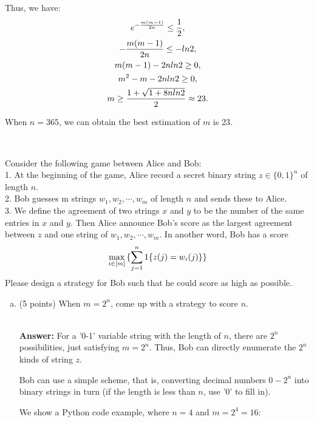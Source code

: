 \documentclass[12pt]{article}
\newcommand{\Answer}{\ \\ \textbf{Answer:} }
\begin{document}
\begin{problem}
Thus, we have:
\begin{gather*}
e^{-\frac{m(m-1)}{2n}} \le \frac{1}{2}, \\ \notag
-\frac{m(m-1)}{2n} \le -ln2, \\
m(m - 1) - 2n ln 2 \ge 0, \\
m^2 - m - 2n ln 2 \ge 0, \\
m \ge \frac{1 + \sqrt{1 + 8n ln2}}{2} \approx 23.\\
\end{gather*}

When $n = 365$, we can obtain the best estimation of $m$ is 23.
\end{problem}



~\\
\begin{problem}
Consider the following game between Alice and Bob: \\
1. At the beginning of the game, Alice record a secret binary string $z \in \{0, 1\}^n$ of length $n$. \\
2. Bob guesses m strings $w_1, w_2, \cdots, w_m$ of length $n$ and sends these to Alice. \\
3. We define the agreement of two strings $x$ and $y$ to be the number of the same entries in $x$ and $y$.
Then Alice announce Bob's score as the largest agreement between $z$ and one string of $w_1, w_2, \cdots, w_m$. In another word, Bob has a score
\begin{equation}
\begin{aligned}
\max_{i \in [m]}{\{\sum_{j=1}^n{1\{z(j) = w_i(j)\}}\}} \notag
\end{aligned}
\end{equation}
Please design a strategy for Bob such that he could score as high as possible.

\begin{enumerate}[(a)]
\item (5 points) When $m = 2^n$, come up with a strategy to score $n$.

\Answer
For a '0-1' variable string with the length of $n$, there are $2^n$ possibilities, just satisfying $m = 2^n$. Thus, Bob can directly enumerate the $2^n$ kinds of string $z$.

Bob can use a simple scheme, that is, converting decimal numbers $0-2^n$ into binary strings in turn (if the length is less than $n$, use '0' to fill in).

We show a Python code example, where $n = 4$ and $m = 2^4 = 16$:


\end{enumerate}
\end{problem}
\end{document}
